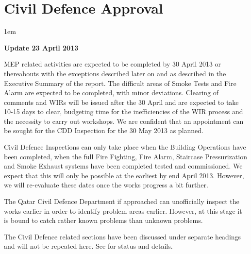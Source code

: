\chapter{Civil Defence Approval}
\parindent1em
\label{civildefence}

\begin{update}
\centerline{\textbf{Update 23 April 2013}}

\noindent MEP related activities are expected to be completed by 30 April 2013 or thereabouts with the exceptions described later on and as described in the Executive Summary of the report. The difficult areas of Smoke Tests and Fire Alarm are expected to be completed, with minor deviations. Clearing of comments and WIRs will be issued after the 30 April and are expected to take 10-15 days to clear, budgeting time for the inefficiencies of the WIR process and the necessity to carry out workshops. We are confident that 
an appointment can be sought for the CDD Inspection for the 30 May 2013 as planned.

\end{update}

Civil Defence Inspections can only take place when the Building Operations have been completed, when the full Fire Fighting,  Fire Alarm, Staircase Pressurization and Smoke Exhaust systems have been completed tested and commissioned. We expect that this will only be possible at the earliest by end April  2013. However, we will re-evaluate these dates once the works progress a bit further. 


The Qatar Civil Defence Department if approached can unofficially inspect the works earlier in order to identify problem areas earlier. However, at this stage it is bound to catch rather known problems than unknown problems.

The Civil Defence related sections have been discussed under separate headings and will not be repeated here. See  for status and details.


